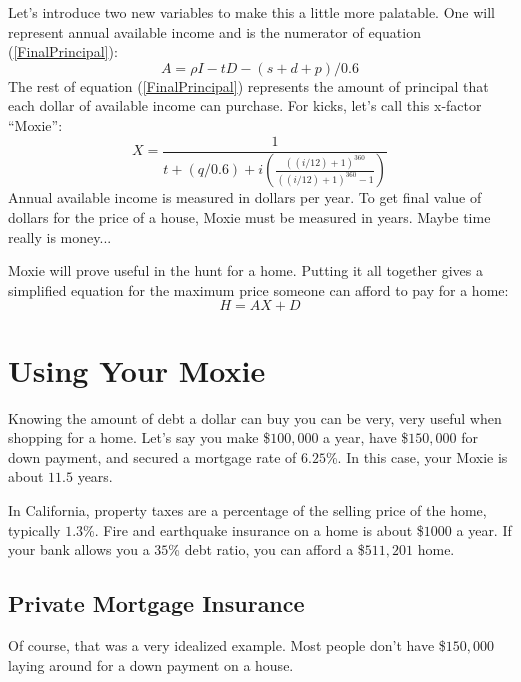 \documentclass{article}
\begin{document}
Let's introduce two new variables to make this a 
little more palatable. One will represent
 annual available income
 and is the numerator of equation (\ref{FinalPrincipal}):
\begin{equation}
\label{AvailableIncome}
A = \rho I - tD - (s + d + p) / 0.6
\end{equation}
The rest of equation (\ref{FinalPrincipal}) represents the amount of
 principal that each dollar of available income can purchase.
For kicks, let's call this x-factor ``Moxie'': 
\begin{equation}
\label{Moxie}
X = \frac{1}{t + (q/0.6) +
i \left( \frac{((i/12) + 1)^{360}}{((i/12) + 1)^{360} - 1} \right)}
\end{equation}
Annual available income is measured in dollars per year.
To get final value of dollars for the price of a house, Moxie
must be measured in years. Maybe time really is money...

Moxie will prove useful in the hunt for a home. 
Putting it all together gives a simplified
 equation for the maximum price someone can afford to pay for a home:
\begin{equation}
\label{SimplifiedHomePrice}
H = AX + D
\end{equation}

\pagebreak


\section{Using Your Moxie}

Knowing the amount of debt a dollar can buy you can be very, 
very useful when 
shopping for a home.  Let's say you make \$$100,000$ a year, have
 \$$150,000$ for down payment, and secured a mortgage rate of 
$6.25$\%.  In this case, your Moxie is about $11.5$ years. 

In California, property taxes are a percentage of the
 selling price of the home, typically $1.3$\%.  Fire and earthquake
 insurance on a home is about \$$1000$ a year. If your bank allows 
you a $35$\% debt ratio, you can afford a \$$511,201$ home.

\subsection{Private Mortgage Insurance}

Of course, that was a very idealized example. Most people don't have 
\$$150,000$ laying around for a down payment on a house. 
\end{document}

